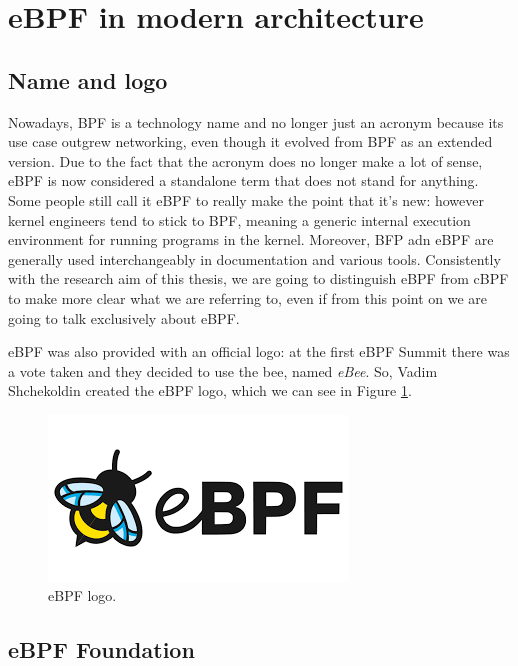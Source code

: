 \section{eBPF in modern architecture}

\subsection{Name and logo}

Nowadays, BPF is a technology name and no longer just an acronym because its use case outgrew networking, even though it evolved from BPF as an extended version.
Due to the fact that the acronym does no longer make a lot of sense, eBPF is now considered a standalone term that does not stand for anything.
Some people still call it eBPF to really make the point that it's new: however kernel engineers tend to stick to BPF, meaning a generic internal execution environment for running programs in the kernel.
Moreover, BFP adn eBPF are generally used interchangeably in documentation and various tools.
Consistently with the research aim of this thesis, we are going to distinguish eBPF from cBPF to make more clear what we are referring to, even if from this point on we are going to talk exclusively about eBPF.

eBPF was also provided with an official logo: at the first eBPF Summit there was a vote taken and they decided to use the bee, named \textit{eBee}.
So, Vadim Shchekoldin created the eBPF logo, which we can see in Figure \ref{fig:eBPF_logo}.

\begin{figure}[h]
	\centering
	\includegraphics[width=0.7\linewidth]{images/History/eBPF_logo.png}
	\caption{eBPF logo.}
	\label{fig:eBPF_logo}
\end{figure}

\subsection{eBPF Foundation}

